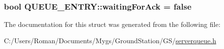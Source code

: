 \subsubsection[{waiting\+For\+Ack}]{\setlength{\rightskip}{0pt plus 5cm}bool Q\+U\+E\+U\+E\+\_\+\+E\+N\+T\+R\+Y\+::waiting\+For\+Ack = false}\label{struct_q_u_e_u_e___e_n_t_r_y_a881ee0110089a84a651334a82c556795}


The documentation for this struct was generated from the following file\+:\begin{DoxyCompactItemize}
\item 
C\+:/\+Users/\+Roman/\+Documents/\+Mygs/\+Ground\+Station/\+G\+S/\hyperlink{serverqueue_8h}{serverqueue.\+h}\end{DoxyCompactItemize}
